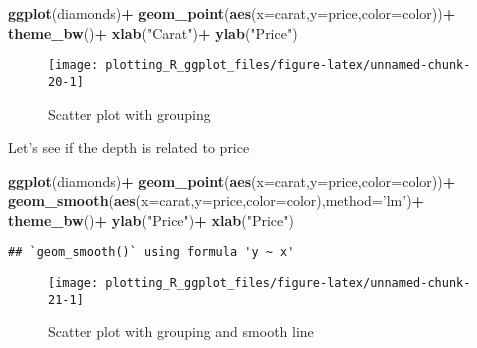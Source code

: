 \documentclass[
]{book}
\newenvironment{Shaded}{\begin{snugshade}}{\end{snugshade}}
\newcommand{\DataTypeTok}[1]{\textcolor[rgb]{0.13,0.29,0.53}{#1}}
\newcommand{\KeywordTok}[1]{\textcolor[rgb]{0.13,0.29,0.53}{\textbf{#1}}}
\newcommand{\NormalTok}[1]{#1}
\newcommand{\OperatorTok}[1]{\textcolor[rgb]{0.81,0.36,0.00}{\textbf{#1}}}
\newcommand{\StringTok}[1]{\textcolor[rgb]{0.31,0.60,0.02}{#1}}
\begin{document}
\begin{Shaded}
\begin{Highlighting}[]
         \KeywordTok{ggplot}\NormalTok{(diamonds)}\OperatorTok{+}
\StringTok{          }\KeywordTok{geom_point}\NormalTok{(}\KeywordTok{aes}\NormalTok{(}\DataTypeTok{x=}\NormalTok{carat,}\DataTypeTok{y=}\NormalTok{price,}\DataTypeTok{color=}\NormalTok{color))}\OperatorTok{+}
\StringTok{  }\KeywordTok{theme_bw}\NormalTok{()}\OperatorTok{+}
\StringTok{  }\KeywordTok{xlab}\NormalTok{(}\StringTok{"Carat"}\NormalTok{)}\OperatorTok{+}\StringTok{ }\KeywordTok{ylab}\NormalTok{(}\StringTok{"Price"}\NormalTok{)}
\end{Highlighting}
\end{Shaded}

\begin{figure}

{\centering \texttt{[image: plotting\_R\_ggplot\_files/figure-latex/unnamed-chunk-20-1]} 

}

\caption{Scatter plot with grouping}\label{fig:unnamed-chunk-20}
\end{figure}

Let's see if the depth is related to price

\begin{Shaded}
\begin{Highlighting}[]
         \KeywordTok{ggplot}\NormalTok{(diamonds)}\OperatorTok{+}
\StringTok{          }\KeywordTok{geom_point}\NormalTok{(}\KeywordTok{aes}\NormalTok{(}\DataTypeTok{x=}\NormalTok{carat,}\DataTypeTok{y=}\NormalTok{price,}\DataTypeTok{color=}\NormalTok{color))}\OperatorTok{+}
\StringTok{  }\KeywordTok{geom_smooth}\NormalTok{(}\KeywordTok{aes}\NormalTok{(}\DataTypeTok{x=}\NormalTok{carat,}\DataTypeTok{y=}\NormalTok{price,}\DataTypeTok{color=}\NormalTok{color),}\DataTypeTok{method=}\StringTok{'lm'}\NormalTok{)}\OperatorTok{+}
\StringTok{  }\KeywordTok{theme_bw}\NormalTok{()}\OperatorTok{+}
\StringTok{  }\KeywordTok{ylab}\NormalTok{(}\StringTok{"Price"}\NormalTok{)}\OperatorTok{+}\StringTok{ }\KeywordTok{xlab}\NormalTok{(}\StringTok{"Price"}\NormalTok{)}
\end{Highlighting}
\end{Shaded}

\begin{verbatim}
## `geom_smooth()` using formula 'y ~ x'
\end{verbatim}

\begin{figure}

{\centering \texttt{[image: plotting\_R\_ggplot\_files/figure-latex/unnamed-chunk-21-1]} 

}

\caption{Scatter plot with grouping and smooth line}\label{fig:unnamed-chunk-21}
\end{figure}
\end{document}
